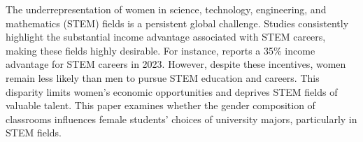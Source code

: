 


The underrepresentation of women in science, technology, engineering, and mathematics (STEM) fields is a persistent global challenge. Studies consistently highlight the substantial income advantage associated with STEM careers, making these fields highly desirable. For instance, \citet{nsf2023} reports a 35\% income advantage for STEM careers in 2023. However, despite these incentives, women remain less likely than men to pursue STEM education and careers. This disparity limits women's economic opportunities and deprives STEM fields of valuable talent. This paper examines whether the gender composition of classrooms influences female students' choices of university majors, particularly in STEM fields. 

